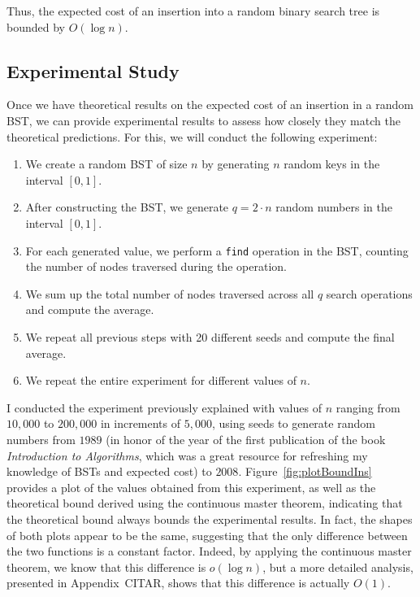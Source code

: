 Thus, the expected cost of an insertion into a random binary search tree is bounded by \( O(\log n) \).

\subsection{Experimental Study}
Once we have theoretical results on the expected cost of an insertion in a random BST, we can provide experimental results to assess how closely they match the theoretical predictions. For this, we will conduct the following experiment:

\begin{enumerate}
    \item We create a random BST of size \( n \) by generating \( n \) random keys in the interval \( [0,1] \).
    \item After constructing the BST, we generate \( q = 2\cdot n \) random numbers in the interval \( [0,1] \).
    \item For each generated value, we perform a \texttt{find} operation in the BST, counting the number of nodes traversed during the operation.
    \item We sum up the total number of nodes traversed across all \( q \) search operations and compute the average.
    \item We repeat all previous steps with 20 different seeds and compute the final average.
    \item We repeat the entire experiment for different values of \( n \).
\end{enumerate}

I conducted the experiment previously explained with values of \( n \) ranging from \( 10,000 \) to \( 200,000 \) in increments of \( 5,000 \), using seeds to generate random numbers from \( 1989 \) (in honor of the year of the first publication of the book \textit{Introduction to Algorithms}, which was a great resource for refreshing my knowledge of BSTs and expected cost) to \( 2008 \). Figure~\ref{fig:plotBoundIns} provides a plot of the values obtained from this experiment, as well as the theoretical bound derived using the continuous master theorem, indicating that the theoretical bound always bounds the experimental results. In fact, the shapes of both plots appear to be the same, suggesting that the only difference between the two functions is a constant factor. Indeed, by applying the continuous master theorem, we know that this difference is \( o(\log n) \), but a more detailed analysis, presented in Appendix~CITAR, shows that this difference is actually \( O(1) \).  

